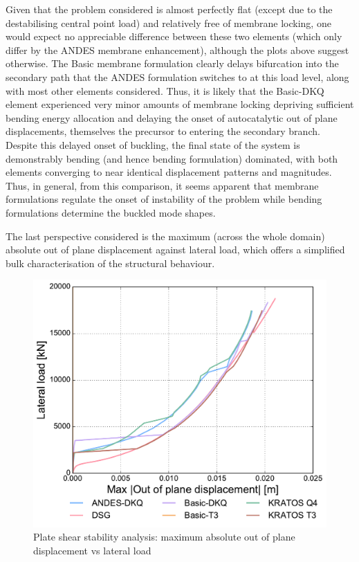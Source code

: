 Given that the problem considered is almost perfectly flat (except due to the destabilising central point load) and relatively free of membrane locking, one would expect no appreciable difference between these two elements (which only differ by the ANDES membrane enhancement), although the plots above suggest otherwise. The Basic membrane formulation clearly delays bifurcation into the secondary path that the ANDES formulation switches to at this load level, along with most other elements considered. Thus, it is likely that the Basic-DKQ element experienced very minor amounts of membrane locking depriving sufficient bending energy allocation and delaying the onset of autocatalytic out of plane displacements, themselves the precursor to entering the secondary branch. Despite this delayed onset of buckling, the final state of the system is demonstrably bending (and hence bending formulation) dominated, with both elements converging to near identical displacement patterns and magnitudes. Thus, in general, from this comparison, it seems apparent that membrane formulations regulate the onset of instability of the problem while bending formulations determine the buckled mode shapes.

The last perspective considered is the maximum (across the whole domain) absolute out of plane displacement against lateral load, which offers a simplified bulk characterisation of the structural behaviour.

\begin{figure}[H]
	\centering
	\def\svgwidth{\columnwidth}
	\includegraphics[width=12cm]{images/stability_wrinkle_abstrans_disp.pdf}
	\caption{Plate shear stability analysis: maximum absolute out of plane displacement vs lateral load}
	\label{pic:wrinkle3}
\end{figure}

